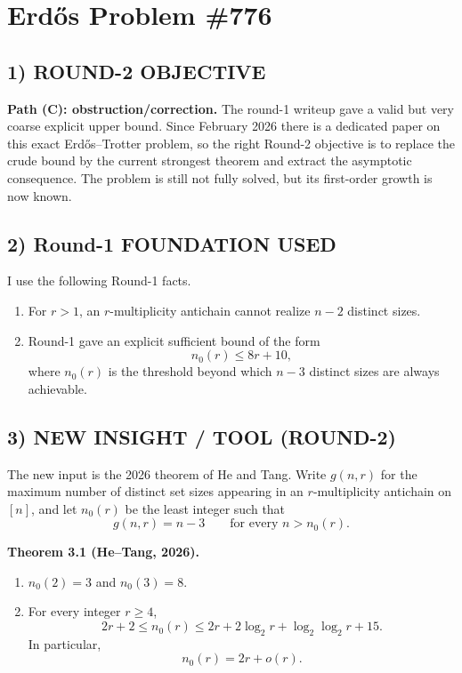 \section{Erd\H{o}s Problem \#776}

\subsection*{1) ROUND-2 OBJECTIVE}
\textbf{Path (C): obstruction/correction.} The round-1 writeup gave a valid but very coarse explicit upper bound. Since February 2026 there is a dedicated paper on this exact Erd\H{o}s--Trotter problem, so the right Round-2 objective is to replace the crude bound by the current strongest theorem and extract the asymptotic consequence. The problem is still not fully solved, but its first-order growth is now known.

\subsection*{2) Round-1 FOUNDATION USED}
I use the following Round-1 facts.

\begin{enumerate}
\item For $r>1$, an $r$-multiplicity antichain cannot realize $n-2$ distinct sizes.
\item Round-1 gave an explicit sufficient bound of the form
\[
 n_0(r)\le 8r+10,
\]
where $n_0(r)$ is the threshold beyond which $n-3$ distinct sizes are always achievable.
\end{enumerate}

\subsection*{3) NEW INSIGHT / TOOL (ROUND-2)}
The new input is the 2026 theorem of He and Tang. Write $g(n,r)$ for the maximum number of distinct set sizes appearing in an $r$-multiplicity antichain on $[n]$, and let $n_0(r)$ be the least integer such that
\[
 g(n,r)=n-3 \qquad \text{for every } n>n_0(r).
\]

\medskip
\noindent\textbf{Theorem 3.1 (He--Tang, 2026).}
\begin{enumerate}
\item $n_0(2)=3$ and $n_0(3)=8$.
\item For every integer $r\ge 4$,
\[
2r+2\le n_0(r)\le 2r+2\log_2 r+\log_2\log_2 r+15.
\]
In particular,
\[
 n_0(r)=2r+o(r).
\]
\end{enumerate}

